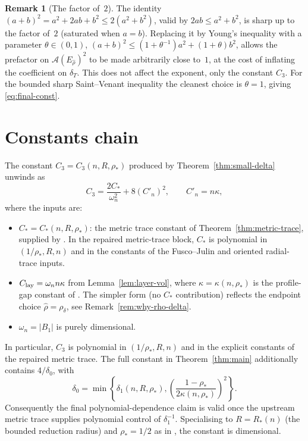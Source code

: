 \documentclass[11pt]{article}
\theoremstyle{definition}
\newtheorem{remark}[theorem]{Remark}
\newcommand{\Fr}{\mathcal{A}}
\newcommand{\rstar}{\rho_{*}}
\newcommand{\rhad}{\widehat\rho}
\begin{document}
\begin{remark}[The factor of~$2$]\label{rem:factor-2}
The identity $(a+b)^2=a^2+2ab+b^2\le 2(a^2+b^2)$, valid by
$2ab\le a^2+b^2$, is sharp up to the factor of~$2$ (saturated when
$a=b$). Replacing it by Young's inequality with a parameter
$\theta\in(0,1)$, $(a+b)^2\le (1+\theta^{-1})a^2+(1+\theta)b^2$,
allows the prefactor on $\Fr(E_{\rhad})^2$ to be made arbitrarily
close to~$1$, at the cost of inflating the coefficient on
$\delta_T$. This does not affect the exponent, only the constant
$C_3$. For the bounded sharp Saint--Venant inequality the cleanest
choice is $\theta=1$, giving \eqref{eq:final-const}.
\end{remark}

\section{Constants chain}\label{sec:constants}

The constant $C_3=C_3(n,R,\rstar)$ produced by
Theorem~\ref{thm:small-delta} unwinds as
\begin{equation}\label{eq:C3-chain}
C_3=\frac{2C_*}{\omega_n^{2}}+8(C'_n)^{2},
\qquad C'_n=n\kappa,
\end{equation}
where the inputs are:

\begin{itemize}
\item $C_*=C_*(n,R,\rstar)$: the metric trace constant of
Theorem~\ref{thm:metric-trace}, supplied by
\cite[Theorem on weighted metric trace]{WeightedMetricTrace}. In the
repaired metric-trace block, $C_*$ is polynomial in
$(1/\rstar, R, n)$ and in the constants of the Fusco--Julin and
oriented radial-trace inputs.

\item $C_{\rm lay}=\omega_n n\kappa$ from Lemma~\ref{lem:layer-vol},
where $\kappa=\kappa(n,\rstar)$ is the profile-gap constant of
\cite{LevelSetIdentity}.  The simpler form (no $C_*$ contribution)
reflects the endpoint choice $\rhad=\rho_\delta$, see
Remark~\ref{rem:why-rho-delta}.

\item $\omega_n=|B_1|$ is purely dimensional.
\end{itemize}

In particular, $C_3$ is polynomial in $(1/\rstar, R, n)$ and in the
explicit constants of the repaired metric trace. The full constant in
Theorem~\ref{thm:main} additionally contains
$4/\delta_0$, with
\[
  \delta_0=\min\left\{\delta_1(n,R,\rstar),
  \left(\frac{1-\rstar}{2\kappa(n,\rstar)}\right)^2\right\}.
\]
Consequently the final polynomial-dependence claim is valid once the
upstream metric trace supplies polynomial control of
$\delta_1^{-1}$. Specialising to $R=R_*(n)$ (the bounded reduction
radius) and $\rstar=1/2$ as in \cite{WeightedMetricTrace}, the
constant is dimensional.
\end{document}
